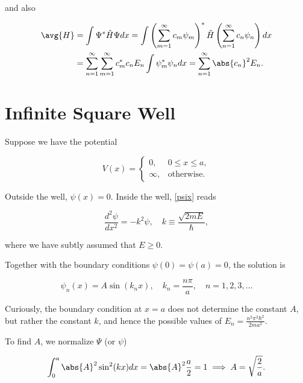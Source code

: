 \documentclass[a4paper,12pt]{report}
\begin{document}
and also 

\begin{equation}
  \begin{aligned} 
    \avg{H} &= \int \Psi ^* \hat{H} \Psi dx = \int \left( \sum_{m=1}^{\infty}c_{m}\psi _{m}   \right) ^*  \hat{H} \left( \sum_{n=1}^{\infty}c_{n}\psi _{n}    \right) dx \\ &= \sum_{n=1}^{\infty}\sum_{m=1}^{\infty}c_{m}^*c_{n}E_{n}\int \psi _{m}^*\psi _{n}dx = \sum_{n=1}^{\infty}\abs{c_{n} }^2E_{n}.          
  \end{aligned} 
\end{equation}



\section{Infinite Square Well}

Suppose we have the potential 

\begin{equation}
  V(x) =
  \begin{cases} 
  0, & 0 \leq x \leq a, \\
  \infty, & \text{otherwise}.
  \end{cases}
\end{equation}

Outside the well, \(\psi (x) = 0\). Inside the well, \cref{psix} reads 

\begin{equation}
  \frac{d^2\psi }{dx^2} = -k^2\psi , \quad  \displaystyle k \equiv \frac{\sqrt{2mE} }{\hbar },
\end{equation}

where we have subtly assumed that \(E \ge 0\).  

Together with the boundary conditions \(\psi (0) = \psi (a) = 0\), the solution is  

\begin{equation}
  \psi _{n} (x) = A\sin (k_{n} x), \quad k_{n} = \frac{n\pi }{a}, \quad n = 1,2,3,\ldots 
\end{equation}

Curiously, the boundary condition at \(x = a\) does not determine the constant \(A\), but rather the constant \(k\), and hence the possible values of \(\displaystyle E_{n} = \frac{n^2\pi ^2\hbar ^2}{2ma^2}\).

To find \(A\), we normalize \(\Psi \) (or \(\psi \)) 

\begin{equation}
  \int_{0}^{a} \abs{A}^2 \sin ^2(kx) dx = \abs{A}^2 \frac{a}{2} = 1 \implies A = \sqrt{\frac{2}{a} }.      
\end{equation}
\end{document}
